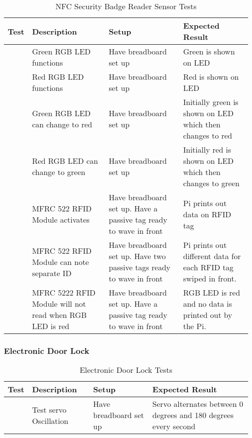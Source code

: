 \begin{table*}[htb]
\centering
\begin{tabular}{>{\centering\arraybackslash}m{0.75cm}|>{\centering\arraybackslash}m{4cm}|>{\centering\arraybackslash}m{4.5cm}|>{\centering\arraybackslash}m{4cm}}
\toprule
Test & Description & Setup & Expected Result \\
\midrule
1 & Green RGB LED functions & Have breadboard set up & Green is shown on LED \\
\hline
2 & Red RGB LED functions & Have breadboard set up & Red is shown on LED \\
\hline
3 & Green RGB LED can change to red & Have breadboard set up & Initially green
is shown on LED which then changes to red \\
\hline
4 & Red RGB LED can change to green & Have breadboard set up & Initially red is
shown on LED which then changes to green \\
\hline
5 & MFRC 522 RFID Module activates & Have breadboard set up. Have a passive tag
ready to wave in front & Pi prints out data on RFID tag \\
\hline
6 & MFRC 522 RFID Module can note separate ID & Have breadboard set up. Have two
passive tags ready to wave in front & Pi prints out different data for each RFID
tag swiped in front. \\
\hline
7 & MFRC 5222 RFID Module will not read when RGB LED is red & Have breadboard
set up. Have a passive tag ready to wave in front & RGB LED is red and no data
is printed out by the Pi. \\
\bottomrule
\end{tabular}
\caption{NFC Security Badge Reader Sensor Tests}
\label{table:nfc-tests}
\end{table*}

\subsubsection{Electronic Door Lock}

\begin{table*}[htb]
\centering
\begin{tabular}{>{\centering\arraybackslash}m{0.75cm}|>{\centering\arraybackslash}m{4cm}|>{\centering\arraybackslash}m{4.5cm}|>{\centering\arraybackslash}m{4cm}}
\toprule
Test & Description & Setup & Expected Result \\
\midrule
1 & Test servo Oscillation & Have breadboard set up & Servo alternates between
0 degrees and 180 degrees every second \\
\bottomrule
\end{tabular}
\caption{Electronic Door Lock Tests}
\label{table:servo-tests}
\end{table*}


